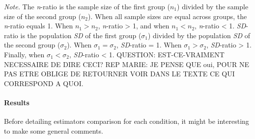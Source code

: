 \documentclass[
  man,floatsintext]{apa6}
\begin{document}
\emph{Note.} The \emph{n}-ratio is the sample size of the first group (\(n_1\)) divided by the sample size of the second group (\(n_2\)). When all sample sizes are equal across groups, the \emph{n}-ratio equals 1. When \(n_1 > n_2\), \emph{n}-ratio \textgreater{} 1, and when \(n_1 < n_2\), \emph{n}-ratio \textless{} 1. \emph{SD}-ratio is the population \emph{SD} of the first group (\(\sigma_1\)) divided by the population \emph{SD} of the second group (\(\sigma_2\)). When \(\sigma_1=\sigma_2\), \emph{SD}-ratio = 1. When \(\sigma_1>\sigma_2\), \emph{SD}-ratio \textgreater{} 1. Finally, when \(\sigma_1<\sigma_2\), \emph{SD}-ratio \textless{} 1.
QUESTION: EST-CE-VRAIMENT NECESSAIRE DE DIRE CECI? REP MARIE: JE PENSE QUE oui, POUR NE PAS ETRE OBLIGE DE RETOURNER VOIR DANS LE TEXTE CE QUI CORRESPOND A QUOI.

\hypertarget{results}{%
\paragraph{Results}\label{results}}

Before detailing estimators comparison for each condition, it might be interesting to make some general comments.
\end{document}
